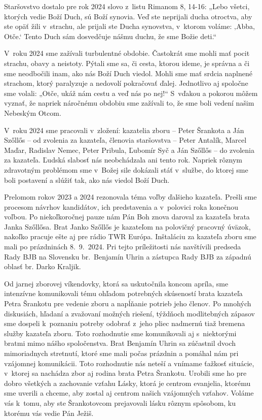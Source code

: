 


Staršovstvo dostalo pre rok 2024 slovo z~listu Rimanom 8, 14-16: „Lebo všetci, ktorých vedie Boží Duch, sú Boží synovia. Veď ste neprijali ducha otroctva, aby ste opäť žili v~strachu, ale prijali ste Ducha synovstva, v~ktorom voláme: ‚Abba, Otče.‘ Tento Duch sám dosvedčuje nášmu duchu, že sme Božie deti.“

V~roku 2024 sme zažívali turbulentné obdobie. Častokrát sme mohli mať pocit strachu, obavy a neistoty. Pýtali sme sa, či cesta, ktorou ideme, je správna a či sme neodbočili inam, ako nás Boží Duch viedol. Mohli sme mať srdcia naplnené strachom, ktorý paralyzuje a nedovolí pokračovať ďalej. Jednotlivo aj spoločne sme volali: „Otče, ukáž nám cestu a veď nás po nej!“ S~vďakou a pokorou môžem vyznať, že napriek náročnému obdobiu sme zažívali to, že sme boli vedení našim Nebeským Otcom.

V~roku 2024 sme pracovali v~zložení: kazatelia zboru -- Peter Šrankota a Ján Szőllős -- od zvolenia za kazateľa, členovia staršovstva -- Peter Antalík, Marcel Maďar, Radislav Nemec, Peter Pribula, Ľubomír Syč a Ján Szőllős -- do zvolenia za kazateľa.
Ľudská slabosť nás neobchádzala ani tento rok. Napriek rôznym zdravotným problémom sme v~Božej sile dokázali stáť v~službe, do ktorej sme boli postavení a slúžiť tak, ako nás viedol Boží Duch.

Prelomom rokov 2023 a 2024 rezonovala téma voľby ďalšieho kazateľa. Prešli sme procesom návrhov kandidátov, ich predstavenia a v~polovici roka konečnou voľbou.
Po niekoľkoročnej pauze nám Pán Boh znova daroval za kazateľa brata Janka Szőllősa. Brat Janko Szőllős je kazateľom na polovičný pracovný úväzok, nakoľko pracuje ešte aj pre rádio TWR Európa. Inštaláciu za kazateľa zboru sme mali po prázdninách 8.~9.~2024. Pri tejto príležitosti nás navštívili predseda Rady BJB na Slovensku br.~Benjamín Uhrin a zástupca Rady BJB za západnú oblasť br. Darko Kraljik.

Od jarnej zborovej víkendovky, ktorá sa uskutočnila koncom apríla, sme intenzívne komunikovali tému ohľadom potrebných skúseností brata kazateľa Petra Šrankotu pre vedenie zboru a napĺňanie potrieb jeho členov. Po mnohých diskusiách, hľadaní a zvažovaní možných riešení, týždňoch modlitebných zápasov sme dospeli k~poznaniu potreby odobrať z~jeho pliec nadmernú tiaž bremena služby kazateľa zboru. Toto rozhodnutie sme komunikovali aj s~niektorými bratmi mimo nášho spoločenstva. Brat Benjamín Uhrin sa zúčastnil dvoch mimoriadnych stretnutí, ktoré sme mali počas prázdnin a pomáhal nám pri vzájomnej komunikácii. Toto rozhodnutie nás neteší a vnímame ťažkosť situácie, v~ktorej sa nachádza zbor aj rodina brata Petra Šrankotu. Urobili sme ho pre dobro všetkých a zachovanie vzťahu Lásky, ktorá je centrom evanjelia, ktorému sme uverili a chceme, aby zostal aj centrom našich vzájomných vzťahov. Voláme vás k~tomu, aby ste Šrankotovcom prejavovali lásku rôznym spôsobom, ku ktorému vás vedie Pán Ježiš.

